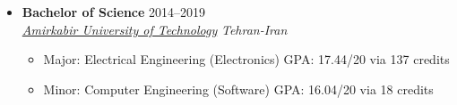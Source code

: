 \documentclass[10pt,a4paper,sans]{moderncv} %
\newcommand*{\authorimg}[1]{%
	\raisebox{-.3\baselineskip}{%
		\texttt{[image: \#1]}%
	}%
}
\begin{document}
\begin{itemize}
	
	\item \textbf{Bachelor of Science} \hfill 2014--2019 \\
	\href{http://aut.ac.ir/}{\authorimg{pictures/aut.png} \emph{Amirkabir University of Technology}} \hfill \emph{Tehran-Iran}

	\begin{itemize}
		\item Major: Electrical Engineering (Electronics) \hspace{30 pt}  GPA: 17.44/20 via 137 credits
		\item Minor: Computer Engineering (Software) \hspace{37 pt} GPA: 16.04/20 via 18 credits
	\end{itemize}
	

\end{itemize}



%
%	
%	

\end{document}
